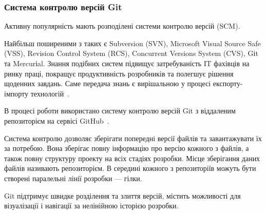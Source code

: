 \subsubsection{Система контролю версій Git}

Активну популярність мають розподілені системи контролю версій (SCM).

Найбільш поширеними з таких є Subversion (SVN), Microsoft Visual Source Safe (VSS), Revision Control System (RCS), Concurrent Versions System (CVS), Gіt та Mercurіal. Знання подібних систем підвищує затребуваність ІT фахівців на ринку праці, покращує продуктивність розробників та полегшує рішення щоденних завдань. Саме передача знань є вирішальною у процесі експорту-імпорту технологій~\cite{киричек2012модель}.

В процесі роботи використано систему контролю версій Git з віддаленим репозиторієм на сервісі GitHub~\cite{gCalShedule}.

Система контролю дозволяє зберігати попередні версії файлів та завантажувати їх за потребою. Вона зберігає повну інформацію про версію кожного з файлів, а також повну структуру проекту на всіх стадіях розробки. Місце зберігання даних файлів називають репозиторієм. В середині кожного з репозиторіїв можуть бути створені паралельні лінії розробки — гілки.

Git підтримує швидке розділення та злиття версій, містить можливості для візуалізації і навігації за нелінійною історією розробки. 

